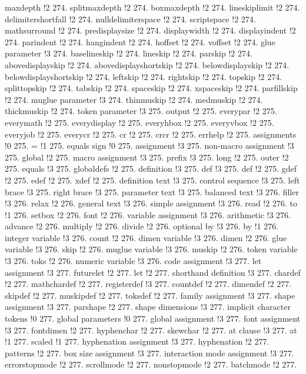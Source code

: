 maxdepth !2 274.
splitmaxdepth !2 274.
boxmaxdepth !2 274.
lineskiplimit !2 274.
delimitershortfall !2 274.
nulldelimiterspace !2 274.
scriptspace !2 274.
mathsurround !2 274.
predisplaysize !2 274.
displaywidth !2 274.
displayindent !2 274.
parindent !2 274.
hangindent !2 274.
hoffset !2 274.
voffset !2 274.
glue parameter !3 274.
baselineskip !2 274.
lineskip !2 274.
parskip !2 274.
abovedisplayskip !2 274.
abovedisplayshortskip !2 274.
belowdisplayskip !2 274.
belowdisplayshortskip !2 274.
leftskip !2 274.
rightskip !2 274.
topskip !2 274.
splittopskip !2 274.
tabskip !2 274.
spaceskip !2 274.
xspaceskip !2 274.
parfillskip !2 274.
muglue parameter !3 274.
thinmuskip !2 274.
medmuskip !2 274.
thickmuskip !2 274.
token parameter !3 275.
output !2 275.
everypar !2 275.
everymath !2 275.
everydisplay !2 275.
everyhbox !2 275.
everyvbox !2 275.
everyjob !2 275.
everycr !2 275.
cr !2 275.
crcr !2 275.
errhelp !2 275.
assignments !0 275.
= !1 275.
equals sign !0 275.
assignment !3 275.
non-macro assignment !3 275.
global !2 275.
macro assignment !3 275.
prefix !3 275.
long !2 275.
outer !2 275.
equals !3 275.
globaldefs !2 275.
definition !3 275.
def !3 275.
def !2 275.
gdef !2 275.
edef !2 275.
xdef !2 275.
definition text !3 275.
control sequence !3 275.
left brace !3 275.
right brace !3 275.
parameter text !3 275.
balanced text !3 276.
filler !3 276.
relax !2 276.
general text !3 276.
simple assignment !3 276.
read !2 276.
to !1 276.
setbox !2 276.
font !2 276.
variable assignment !3 276.
arithmetic !3 276.
advance !2 276.
multiply !2 276.
divide !2 276.
optional {\fam \ttfam \ninett by} !3 276.
by !1 276.
integer variable !3 276.
count !2 276.
dimen variable !3 276.
dimen !2 276.
glue variable !3 276.
skip !2 276.
muglue variable !3 276.
muskip !2 276.
token variable !3 276.
toks !2 276.
numeric variable !3 276.
code assignment !3 277.
let assignment !3 277.
futurelet !2 277.
let !2 277.
shorthand definition !3 277.
chardef !2 277.
mathchardef !2 277.
registerdef !3 277.
countdef !2 277.
dimendef !2 277.
skipdef !2 277.
muskipdef !2 277.
toksdef !2 277.
family assignment !3 277.
shape assignment !3 277.
parshape !2 277.
shape dimensions !3 277.
implicit character tokens !0 277.
global parameters !0 277.
global assignment !3 277.
font assignment !3 277.
fontdimen !2 277.
hyphenchar !2 277.
skewchar !2 277.
at clause !3 277.
at !1 277.
scaled !1 277.
hyphenation assignment !3 277.
hyphenation !2 277.
patterns !2 277.
box size assignment !3 277.
interaction mode assignment !3 277.
errorstopmode !2 277.
scrollmode !2 277.
nonstopmode !2 277.
batchmode !2 277.

